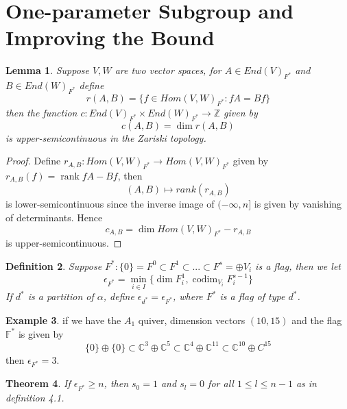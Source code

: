 \documentclass[12pt]{amsart}
\theoremstyle{plain}
\newtheorem{thm}{Theorem}[section]
\newtheorem{lem}[thm]{Lemma}
\newtheorem{defn}[thm]{Definition}
\theoremstyle{definition}
\newtheorem{ex}[thm]{Example}
\theoremstyle{remark}
\begin{document}
\section{One-parameter Subgroup and Improving the Bound}
\begin{lem} Suppose $V,W$ are two vector spaces, for $A\in End(V)_{F^*}$ and $B\in End(W)_{F^*}$ define 
$$r(A,B)=\{f\in Hom(V,W)_{F^*}:fA=Bf\}$$
then the function $c:End(V)_{F^*}\times End(W)_{F^*}\to \mathbb Z$ given by 
$$c(A,B)=\dim r(A,B)$$
is upper-semicontinuous in the Zariski topology.
\end{lem}
\begin{proof}
Define $r_{A,B}:Hom(V,W)_{F^*}\to Hom(V,W)_{F^*}$ given by $r_{A,B}(f)=\operatorname{rank}fA-Bf$, then 
$$(A,B)\mapsto rank(r_{A,B})$$
is lower-semicontinuous since the inverse image of $(-\infty,n]$ is given by vanishing of determinants. Hence 
$$c_{A,B}=\dim Hom(V,W)_{F^*}-r_{A,B}$$
is upper-semicontinuous. 
\end{proof}
\begin{defn} Suppose $F^*:\{0\}=F^0\subset F^1\subset...\subset F^s=\oplus V_i $ is a flag, then we let 
$$\epsilon_{F^*}=\min_{i\in I}\{\dim F^1_i,\operatorname{codim}_{V_i}F_i^{s-1}\}$$
If $d^*$ is a partition of $\alpha$, define $\epsilon_{d^*}=\epsilon_{F^*}$, where $F^*$ is a flag of type $d^*$.
\end{defn}
\begin{ex} if we have the $A_1$ quiver, dimension vectors $(10,15)$ and the flag $\mathbb F^*$ is given by 
$$\{0\}\oplus\{0\}\subset \mathbb C^3\oplus \mathbb C^5\subset \mathbb C^4\oplus \mathbb C^{11}\subset \mathbb C^{10}\oplus C^{15}$$
then $\epsilon_{F^*}=3$.
\end{ex}
\begin{thm} If $\epsilon_{F^*}\geq n$, then $s_0=1$ and $s_l=0$ for all $1\leq l\leq n-1$ as in definition 4.1.
\end{thm}
\end{document}
